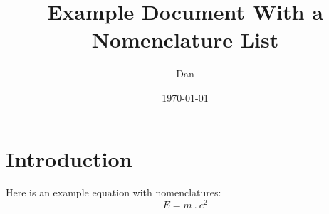 \documentclass[11pt]{article}
\title{Example Document With a Nomenclature List}
\author{Dan}
\date{\today}
\begin{document}
\maketitle
\section{Introduction}
Here is an example equation with nomenclatures:
\begin{equation}
  E = m\:.\:c^2
\end{equation}
%
%
%

\printnomenclature
\end{document}
